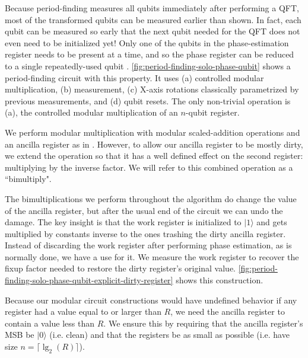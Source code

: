 \documentclass[twocolumn,longbibliography]{quantumarticle-customized}
\begin{document}
Because period-finding measures all qubits immediately after performing a QFT, most of the transformed qubits can be measured earlier than shown.
In fact, each qubit can be measured so early that the next qubit needed for the QFT does not even need to be initialized yet!
Only one of the qubits in the phase-estimation register needs to be present at a time, and so the phase register can be reduced to a single repeatedly-used qubit \cite{zalka1998, mosca1999, parker2000, beauregard2003}.
\autoref{fig:period-finding-solo-phase-qubit} shows a period-finding circuit with this property.
It uses (a) controlled modular multiplication, (b) measurement, (c) X-axis rotations classically parametrized by previous measurements, and (d) qubit resets.
The only non-trivial operation is (a), the controlled modular multiplication of an $n$-qubit register.

We perform modular multiplication with modular scaled-addition operations and an ancilla register as in \cite{beauregard2003}.
However, to allow our ancilla register to be mostly dirty, we extend the operation so that it has a well defined effect on the second register: multiplying by the inverse factor.
We will refer to this combined operation as a ``bimultiply".

The bimultiplications we perform throughout the algorithm do change the value of the ancilla register, but after the usual end of the circuit we can undo the damage.
The key insight is that the work register is initialized to $|1\rangle$ and gets multiplied by constants inverse to the ones trashing the dirty ancilla register.
Instead of discarding the work register after performing phase estimation, as is normally done, we have a use for it.
We measure the work register to recover the fixup factor needed to restore the dirty register's original value.
\autoref{fig:period-finding-solo-phase-qubit-explicit-dirty-register} shows this construction.

Because our modular circuit constructions would have undefined behavior if any register had a value equal to or larger than $R$, we need the ancilla register to contain a value less than $R$.
We ensure this by requiring that the ancilla register's MSB be $|0\rangle$ (i.e. clean) and that the registers be as small as possible (i.e. have size $n = \lceil \lg_2(R) \rceil$).
\end{document}
